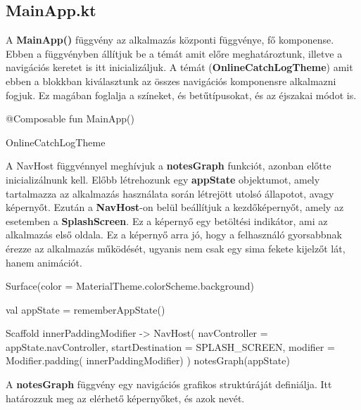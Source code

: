 \subsection{MainApp.kt}

A \textbf{MainApp()} függvény az alkalmazás központi függvénye, fő komponense. Ebben a függvényben állítjuk be a témát amit előre meghatároztunk, illetve a navigációs keretet is itt inicializáljuk.
A témát (\textbf{OnlineCatchLogTheme}) amit ebben a blokkban kiválasztunk az összes navigációs komponensre alkalmazni fogjuk. Ez magában foglalja a színeket, és betűtípusokat, és az éjszakai módot is.

\begin{java}[caption = {MainApp.kt fő függvény leírása.}]
@Composable
fun MainApp() {
    OnlineCatchLogTheme{
    
    }
}
\end{java}

A NavHost függvénnyel meghívjuk a \textbf{notesGraph} funkciót, azonban előtte inicializálnunk kell.
Előbb létrehozunk egy \textbf{appState} objektumot, amely tartalmazza az alkalmazás használata során létrejött utolsó állapotot, avagy képernyőt. Ezután a \textbf{NavHost}-on belül beállítjuk a kezdőképernyőt, amely az esetemben a \textbf{SplashScreen}. Ez a képernyő egy betöltési indikátor, ami az alkalmazás első oldala. Ez a képernyő arra jó, hogy a felhasználó gyorsabbnak érezze az alkalmazás működését, ugyanis nem csak egy sima fekete kijelzőt lát, hanem animációt.

\newpage

\begin{java}[caption = {Navhost meghívása, beállítása.}]
Surface(color = MaterialTheme.colorScheme.background) {
        val appState = rememberAppState()

        Scaffold { innerPaddingModifier ->
            NavHost(
                navController = appState.navController,
                startDestination = SPLASH_SCREEN,
                modifier = Modifier.padding(
                    innerPaddingModifier)
            ) {
                notesGraph(appState)
            }
        }
    }
\end{java}

A \textbf{notesGraph} függvény egy navigációs grafikos struktúráját definiálja.
Itt határozzuk meg az elérhető képernyőket, és azok nevét.

